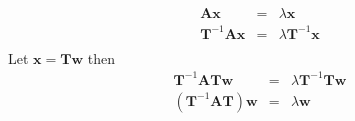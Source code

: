 \begin{eqnarray*}
	\mathbf{Ax} & = & \lambda\mathbf{x} \\
	\mathbf{T}^{-1}\mathbf{Ax} & = & \lambda\mathbf{T}^{-1}\mathbf{x} \\	
\end{eqnarray*}
Let $\mathbf{x}=\mathbf{Tw}$ then
\begin{eqnarray*}
	\mathbf{T}^{-1}\mathbf{ATw} & = & \lambda\mathbf{T}^{-1}\mathbf{Tw} \\	
	(\mathbf{T}^{-1}\mathbf{AT})\mathbf{w} & = & \lambda\mathbf{w} \\	
\end{eqnarray*}


\endinput

